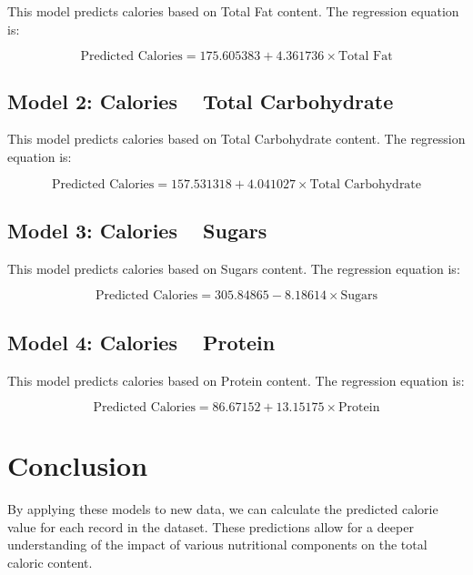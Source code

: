 \documentclass{article}
\begin{document}
This model predicts calories based on Total Fat content. The regression equation is:

\[
\text{Predicted Calories} = 175.605383 + 4.361736 \times \text{Total Fat}
\]

\subsection*{Model 2: Calories ~ Total Carbohydrate}

This model predicts calories based on Total Carbohydrate content. The regression equation is:

\[
\text{Predicted Calories} = 157.531318 + 4.041027 \times \text{Total Carbohydrate}
\]

\subsection*{Model 3: Calories ~ Sugars}

This model predicts calories based on Sugars content. The regression equation is:

\[
\text{Predicted Calories} = 305.84865 - 8.18614 \times \text{Sugars}
\]

\subsection*{Model 4: Calories ~ Protein}

This model predicts calories based on Protein content. The regression equation is:

\[
\text{Predicted Calories} = 86.67152 + 13.15175 \times \text{Protein}
\]

\section*{Conclusion}

By applying these models to new data, we can calculate the predicted calorie value for each record in the dataset. These predictions allow for a deeper understanding of the impact of various nutritional components on the total caloric content.
\end{document}
